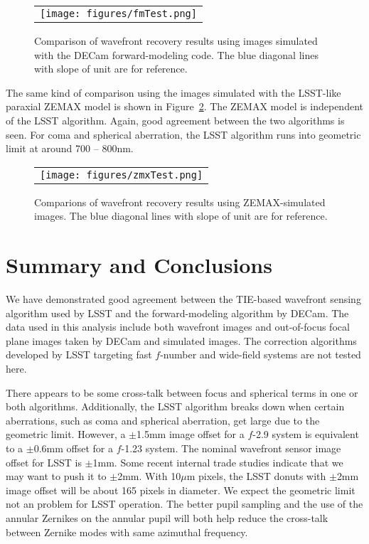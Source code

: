 \documentclass[]{spie}  %
\begin{document}
   \begin{figure} [tbph]
   \begin{center}
   \begin{tabular}{c} %
   \texttt{[image: figures/fmTest.png]}
   \end{tabular}
   \end{center}
   \caption[example] 
   { \label{fig:fmTest} 
Comparison of wavefront recovery results using images simulated with the DECam forward-modeling code.
The blue diagonal lines with slope of unit are for reference.
}
   \end{figure} 
		  
The same kind of comparison using the images simulated with the LSST-like paraxial ZEMAX model is shown in Figure~\ref{fig:zmxTest}. The ZEMAX model is independent of the LSST algorithm.
Again, good agreement between the two algorithms is seen.
For coma and spherical aberration, the LSST algorithm runs into geometric limit at around %
700 -- 800nm.

   \begin{figure} [tbph]
   \begin{center}
   \begin{tabular}{c} %
   \texttt{[image: figures/zmxTest.png]}
   \end{tabular}
   \end{center}
   \caption[example] 
   { \label{fig:zmxTest} 
Comparions of wavefront recovery results using ZEMAX-simulated images.
The blue diagonal lines with slope of unit are for reference.
}
   \end{figure} 

\section{Summary and Conclusions}
\label{sec:summary}

We have demonstrated good agreement between the TIE-based wavefront sensing algorithm used by LSST 
and the forward-modeling algorithm by DECam.
The data used in this analysis include
both wavefront images and out-of-focus focal plane images taken by DECam and simulated images.
The correction algorithms developed by LSST targeting fast $f$-number and wide-field systems are not tested here.

There appears to be some cross-talk between focus and spherical terms in one or both algorithms.
Additionally, the LSST algorithm breaks down when certain aberrations,
such as coma and spherical aberration, get large due to the geometric limit.
However, 
a $\pm$1.5mm image offset for a $f$-2.9 system is equivalent to a $\pm$0.6mm offset for a $f$-1.23 system.
The nominal wavefront sensor image offset for LSST is $\pm$1mm. Some recent internal trade studies indicate that we may want to push it to $\pm$2mm. With 10$\mu$m pixels, the LSST donuts with $\pm$2mm image offset will be about 165 pixels in diameter.
We expect the geometric limit not an problem for LSST operation.
The better pupil sampling and the use of the annular Zernikes on the annular pupil will both help reduce the cross-talk between Zernike modes with same azimuthal frequency.
\end{document}
